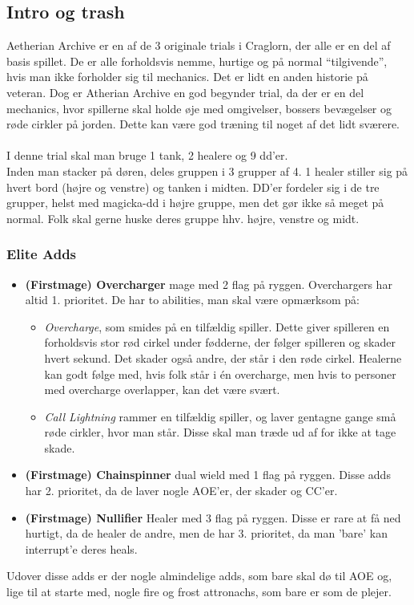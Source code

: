 \subsection*{Intro og trash}
Aetherian Archive er en af de 3 originale trials i Craglorn, der alle er en del
af basis spillet. De er alle forholdsvis nemme, hurtige og på normal
``tilgivende'', hvis man ikke forholder sig til mechanics. Det er lidt en anden
historie på veteran. Dog er Atherian Archive en god begynder trial, da der er
en del mechanics, hvor spillerne skal holde øje med omgivelser, bossers
bevægelser og røde cirkler på jorden. Dette kan være god træning til noget af
det lidt sværere.\\
\\
I denne trial skal man bruge 1 tank, 2 healere og 9 dd'er.\\
Inden man stacker på døren, deles gruppen i 3 grupper af 4. 1 healer stiller
sig på hvert bord (højre og venstre) og tanken i midten. DD'er fordeler sig i
de tre grupper, helst med magicka-dd i højre gruppe, men det gør ikke så meget
på normal. Folk skal gerne huske deres gruppe hhv. højre, venstre og midt.
\subsubsection*{Elite Adds}
\begin{itemize}
  \item \textbf{(Firstmage) Overcharger} mage med 2 flag på ryggen.
    Overchargers har altid 1. prioritet. De har to abilities, man skal være
    opmærksom på: 
    \begin{itemize}
      \item \emph{Overcharge}, som smides på en tilfældig spiller. Dette
        giver spilleren en forholdsvis stor rød cirkel under fødderne, der følger
        spilleren og skader hvert sekund. Det skader også andre, der står i den
        røde cirkel. Healerne kan godt følge med, hvis folk står i én
        overcharge, men hvis to personer med overcharge overlapper, kan det
        være svært.
      \item \emph{Call Lightning} rammer en tilfældig spiller, og laver
        gentagne gange små røde cirkler, hvor man står. Disse skal man træde ud 
        af for ikke at tage skade.
    \end{itemize}
  \item \textbf{(Firstmage) Chainspinner} dual wield med 1 flag på ryggen.
    Disse adds har 2. prioritet, da de laver nogle AOE'er, der skader og
    CC'er. 
  \item \textbf{(Firstmage) Nullifier} Healer med 3 flag på ryggen. Disse er
    rare at få ned hurtigt, da de healer de andre, men de har 3. prioritet, da
    man 'bare' kan interrupt'e deres heals.
\end{itemize}
Udover disse adds er der nogle almindelige adds, som bare skal dø til AOE og,
lige til at starte med, nogle fire og frost attronachs, som bare er som de
plejer. 
